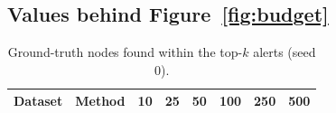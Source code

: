 \subsection{Values behind Figure~\ref{fig:budget}}
\begin{table}[!htbp]\centering\footnotesize\setlength{\tabcolsep}{3pt}
\caption{Ground-truth nodes found within the top-$k$ alerts (seed 0).}
\begin{tabular}{llcccccc}
\toprule
Dataset & Method & 10 & 25 & 50 & 100 & 250 & 500 \\
\midrule
\bottomrule
\end{tabular}
\end{table}
